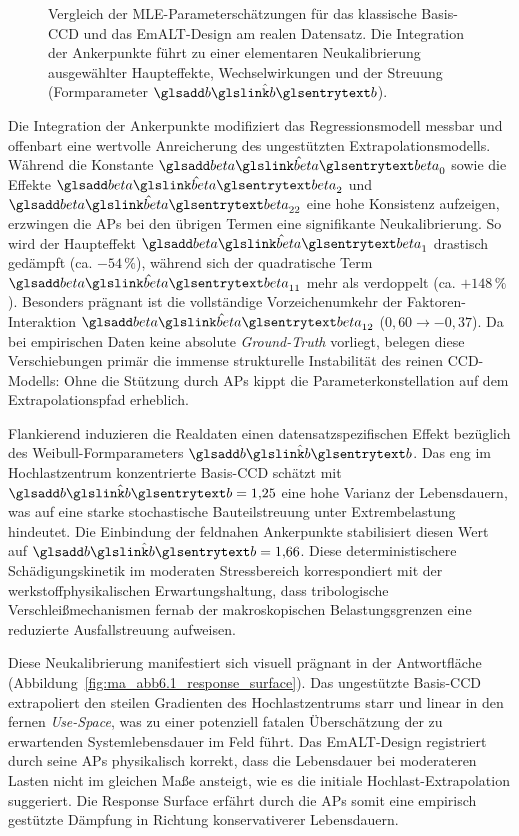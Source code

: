 \begin{figure}[htbp]
    \centering
    \setlength{}
    \setlength\figureheight{5.5cm}
    
    \caption{Vergleich der \ac{MLE}-Parameterschätzungen für das klassische Basis-\ac{CCD} und das \ac{EmALT}-Design am realen Datensatz. Die Integration der Ankerpunkte führt zu einer elementaren Neukalibrierung ausgewählter Haupteffekte, Wechselwirkungen und der Streuung (Formparameter $\hat{\sym{b}}$).}
    \label{fig:ma_abb6.1_parameter_estimates}
\end{figure}

Die Integration der Ankerpunkte modifiziert das Regressionsmodell messbar und offenbart eine wertvolle Anreicherung des ungestützten Extrapolationsmodells.
Während die Konstante $\hat{\sym{beta}}_0$ sowie die Effekte $\hat{\sym{beta}}_2$ und $\hat{\sym{beta}}_{22}$ eine hohe Konsistenz aufzeigen, erzwingen die \acp{AP} bei den übrigen Termen eine signifikante Neukalibrierung.
So wird der Haupteffekt $\hat{\sym{beta}}_1$ drastisch gedämpft (ca. $-54\,\%$), während sich der quadratische Term $\hat{\sym{beta}}_{11}$ mehr als verdoppelt (ca. $+148\,\%$).
Besonders prägnant ist die vollständige Vorzeichenumkehr der Faktoren-Interaktion $\hat{\sym{beta}}_{12}$ ($0{,}60 \to -0{,}37$).
Da bei empirischen Daten keine absolute \textit{Ground-Truth} vorliegt, belegen diese Verschiebungen primär die immense strukturelle Instabilität des reinen \ac{CCD}-Modells: Ohne die Stützung durch \acp{AP} kippt die Parameterkonstellation auf dem Extrapolationspfad erheblich.

Flankierend induzieren die Realdaten einen datensatzspezifischen Effekt bezüglich des Weibull-Formparameters $\hat{\sym{b}}$.
Das eng im Hochlastzentrum konzentrierte Basis-\ac{CCD} schätzt mit $\hat{\sym{b}}=1{,}25$ eine hohe Varianz der Lebensdauern, was auf eine starke stochastische Bauteilstreuung unter Extrembelastung hindeutet.
Die Einbindung der feldnahen Ankerpunkte stabilisiert diesen Wert auf $\hat{\sym{b}}=1{,}66$.
Diese deterministischere Schädigungskinetik im moderaten Stressbereich korrespondiert mit der werkstoffphysikalischen Erwartungshaltung, dass tribologische Verschleißmechanismen fernab der makroskopischen Belastungsgrenzen eine reduzierte Ausfallstreuung aufweisen.

Diese Neukalibrierung manifestiert sich visuell prägnant in der Antwortfläche (Abbildung~\ref{fig:ma_abb6.1_response_surface}).
Das ungestützte Basis-\ac{CCD} extrapoliert den steilen Gradienten des Hochlastzentrums starr und linear in den fernen \textit{Use-Space}, was zu einer potenziell fatalen Überschätzung der zu erwartenden Systemlebensdauer im Feld führt.
Das \ac{EmALT}-Design registriert durch seine \acp{AP} physikalisch korrekt, dass die Lebensdauer bei moderateren Lasten nicht im gleichen Maße ansteigt, wie es die initiale Hochlast-Extrapolation suggeriert.
Die Response Surface erfährt durch die \acp{AP} somit eine empirisch gestützte Dämpfung in Richtung konservativerer Lebensdauern.

